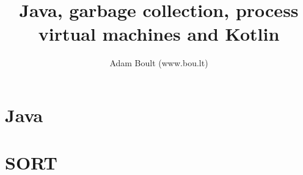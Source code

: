 \documentclass[oneside]{book}
\begin{document}
\author{Adam Boult (www.bou.lt)}
\title{Java, garbage collection, process virtual machines and Kotlin}
\maketitle

\setcounter{tocdepth}{0}
\tableofcontents



\part{Java}


\part{SORT}

\end{document}
